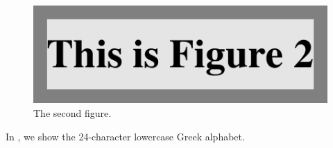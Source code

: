 \begin{figure}[b]
    \centerline{\includegraphics{fig2}}
    \caption{The second figure.}%
\end{figure}

\blah

In , we show the 24-character lowercase Greek alphabet.

\blah

\blah

